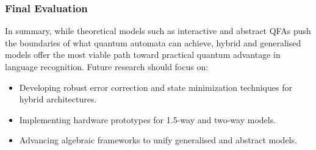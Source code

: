 \subsubsection{Final Evaluation}
In summary, while theoretical models such as interactive and abstract QFAs push the boundaries of what quantum automata can achieve, hybrid and generalised models offer the most viable path toward practical quantum advantage in language recognition. Future research should focus on:
\begin{itemize}
    \item Developing robust error correction and state minimization techniques for hybrid architectures.
    \item Implementing hardware prototypes for 1.5-way and two-way models.
    \item Advancing algebraic frameworks to unify generalised and abstract models.
\end{itemize}

